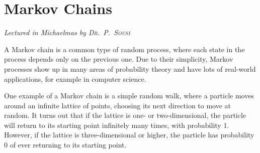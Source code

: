 \chapter[Markov Chains \\ \textnormal{\emph{Lectured in Michaelmas \oldstylenums{2021} by \textsc{Dr.\ P.\ Sousi}}}]{Markov Chains}
\emph{\Large Lectured in Michaelmas  by \textsc{Dr.\ P.\ Sousi}}

A Markov chain is a common type of random process, where each state in the process depends only on the previous one.
Due to their simplicity, Markov processes show up in many areas of probability theory and have lots of real-world applications, for example in computer science.

One example of a Markov chain is a simple random walk, where a particle moves around an infinite lattice of points, choosing its next direction to move at random.
It turns out that if the lattice is one- or two-dimensional, the particle will return to its starting point infinitely many times, with probability 1.
However, if the lattice is three-dimensional or higher, the particle has probability 0 of ever returning to its starting point.



